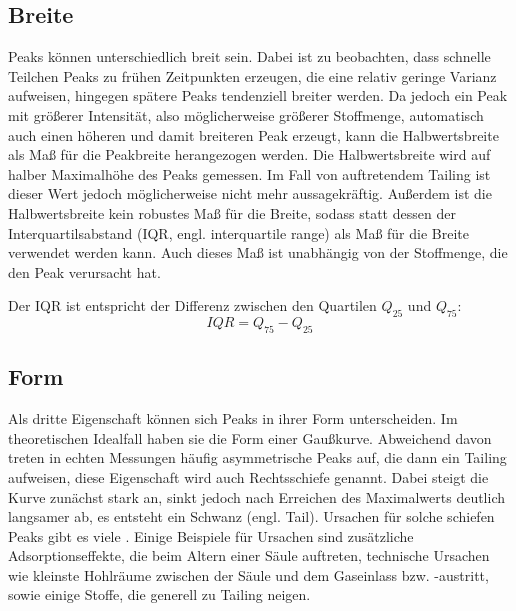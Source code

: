 \subsection{Breite}
Peaks können unterschiedlich breit sein. Dabei ist zu beobachten, dass schnelle Teilchen Peaks zu frühen Zeitpunkten erzeugen, die eine relativ geringe Varianz aufweisen, hingegen spätere Peaks tendenziell breiter werden.
Da jedoch ein Peak mit größerer Intensität, also möglicherweise größerer Stoffmenge, automatisch auch einen höheren und damit breiteren Peak erzeugt, kann die Halbwertsbreite als Maß für die Peakbreite herangezogen werden. Die Halbwertsbreite wird auf halber Maximalhöhe des Peaks gemessen. Im Fall von auftretendem Tailing ist dieser Wert jedoch möglicherweise nicht mehr aussagekräftig. Außerdem ist die Halbwertsbreite kein robustes Maß für die Breite, sodass statt dessen der Interquartilsabstand (IQR, engl. interquartile range) als Maß für die Breite verwendet werden kann. Auch dieses Maß ist unabhängig von der Stoffmenge, die den Peak verursacht hat. 

Der IQR ist entspricht der Differenz zwischen den Quartilen $Q_{25}$ und $Q_{75}$:
\begin{equation}
IQR = Q_{75} -Q_{25}
\end{equation}

 

\subsection{Form}
Als dritte Eigenschaft können sich Peaks in ihrer Form unterscheiden. Im theoretischen Idealfall haben sie die Form einer Gaußkurve. %
Abweichend davon treten in echten Messungen häufig asymmetrische Peaks auf, die dann ein Tailing aufweisen, diese Eigenschaft wird auch Rechtsschiefe genannt. Dabei steigt die Kurve zunächst stark an, sinkt jedoch nach Erreichen des Maximalwerts deutlich langsamer ab, es entsteht ein Schwanz (engl. Tail).
Ursachen für solche schiefen Peaks gibt es viele \citep{kolb2003, Moretti2004, Giddings1963}. Einige Beispiele für Ursachen sind zusätzliche Adsorptionseffekte, die beim Altern einer Säule auftreten, technische Ursachen wie kleinste Hohlräume zwischen der Säule und dem Gaseinlass bzw. -austritt, sowie einige Stoffe, die generell zu Tailing neigen. %

